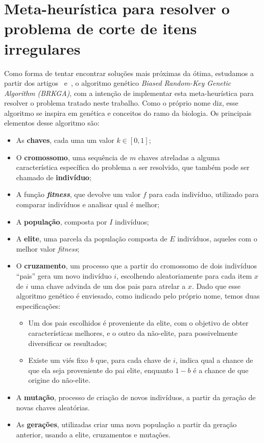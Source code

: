 \section{Meta-heurística para resolver o problema de corte de itens irregulares} \label{sec:BRKGA}

Como forma de tentar encontrar soluções mais próximas da ótima, estudamos a partir dos artigos~\cite{key} e~\cite{containers}, o algoritmo genético \textit{Biased Random-Key Genetic Algorithm (BRKGA)}, com a intenção de implementar esta meta-heurística para resolver o problema tratado neste trabalho. Como o próprio nome diz, esse algoritmo se inspira em genética e conceitos do ramo da biologia. %
Os principais elementos desse algoritmo são:
\begin{itemize}
    \item As \textbf{chaves}, cada uma um valor $k \in [0,1]$;
    \item O \textbf{cromossomo}, uma sequência de $m$ chaves atreladas a alguma característica específica do problema a ser resolvido, que também pode ser chamado de \textbf{indivíduo};
    \item A função \textbf {\textit {fitness}}, que devolve um valor $f$ para cada indivíduo, utilizado para comparar indivíduos e analisar qual é melhor;
    \item A \textbf{população}, composta por $I$ indivíduos;
    \item A \textbf{elite}, uma parcela da população composta de $E$ indivíduos, aqueles com o melhor valor \textit{fitness};
    \item O \textbf{cruzamento}, um processo que a partir do cromossomo de dois indivíduos ``pais'' gera um novo indivíduo $i$, escolhendo aleatoriamente para cada item $x$ de $i$ uma chave advinda de um dos pais para atrelar a $x$. Dado que esse algoritmo genético é enviesado, como indicado pelo próprio nome, temos duas especificações:
    \begin{itemize}
        \item Um dos pais escolhidos é proveniente da elite, com o objetivo de obter características melhores, e o outro da não-elite, para possivelmente diversificar os resultados;
        \item Existe um viés fixo $b$ que, para cada chave de $i$, indica qual a chance de que ela seja proveniente do pai elite, enquanto $1-b$ é a chance de que origine do não-elite.
    \end{itemize}
    \item A \textbf{mutação}, processo de criação de novos indivíduos, a partir da geração de novas chaves aleatórias.
    \item As \textbf{gerações}, utilizadas criar uma nova população a partir da geração anterior, usando a elite, cruzamentos e mutações. 
\end{itemize}

